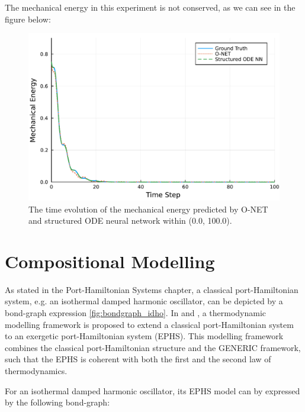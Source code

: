 \documentclass[
	parskip, 			   %
	twoside, 			   %
	DIV=14, 			   %
	BCOR=15.0mm, 		   %
	headsepline, 		   %
	open=right, 		   %
	captions=tableheading, %
	bibliography=totoc,    %
	numbers=noenddot       %
]{scrreprt}
\begin{document}
The mechanical energy in this experiment is not conserved, as we can see in the figure below:

\clearpage
\begin{figure}[h!]
    \centering
    \includegraphics[scale=0.5]{figures/Hamiltonian_evolution_idho_O_NET_and_structured_ODE_NN.pdf}
    \caption{The time evolution of the mechanical energy predicted by O-NET and structured ODE neural network within (0.0, 100.0).}
    \label{fig:Hamiltonian_evolution_idho_O_NET_and_structured_ODE_NN}
\end{figure}


\clearpage
\chapter{Compositional Modelling}
\label{ch:chapter7}

As stated in the Port-Hamiltonian Systems chapter, a classical port-Hamiltonian system, e.g. an isothermal damped harmonic oscillator, can be depicted by a bond-graph expression \ref{fig:bondgraph_idho}. In \cite{lohmayer2022exergetic} and \cite{lohmayer2022ephs}, a thermodynamic modelling framework is proposed to extend a classical port-Hamiltonian system to an exergetic port-Hamiltonian system (EPHS). This modelling framework combines the classical port-Hamiltonian structure and the GENERIC framework, such that the EPHS is coherent with both the first and the second law of thermodynamics.

For an isothermal damped harmonic oscillator, its EPHS model can by expressed by the following bond-graph:
\end{document}
